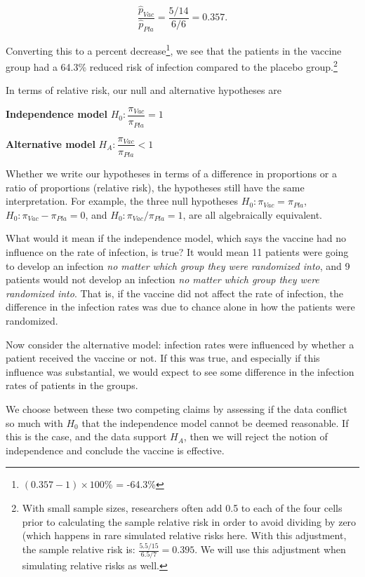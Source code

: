 \documentclass[
  10pt,
  openany]{book}
\theoremstyle{definition}
\theoremstyle{definition}
\theoremstyle{definition}
\theoremstyle{definition}
\theoremstyle{remark}
\begin{document}
\[
\frac{\hat{p}_{Vac}}{\hat{p}_{Pla}} = \frac{5/14}{6/6} = 0.357.
\]

Converting this to a percent decrease\footnote{\((0.357 - 1)\times 100\)\% = -64.3\%}, we see that the patients in the vaccine group had a 64.3\% reduced risk of infection compared to the placebo group.\footnote{With small sample sizes, researchers often add 0.5 to each of the four cells prior to calculating the sample relative risk in order to avoid dividing by zero (which happens in rare simulated relative risks here. With this adjustment, the sample relative risk is: \(\frac{5.5/15}{6.5/7} = 0.395\). We will use this adjustment when simulating relative risks as well.}

In terms of relative risk, our null and alternative hypotheses are

\textbf{Independence model} \(H_0: \dfrac{\pi_{Vac}}{\pi_{Pla}} = 1\)

\textbf{Alternative model} \(H_A: \dfrac{\pi_{Vac}}{\pi_{Pla}} < 1\)

Whether we write our hypotheses in terms of a difference in proportions or a ratio of proportions (relative risk), the hypotheses still have the same interpretation. For example, the three null hypotheses \(H_0: \pi_{Vac} = \pi_{Pla}\), \(H_0: \pi_{Vac} - \pi_{Pla} = 0\), and \(H_0: \pi_{Vac}/\pi_{Pla} = 1\), are all algebraically equivalent.

What would it mean if the independence model, which says the vaccine had no influence on the rate of infection, is true? It would mean 11 patients were going to develop an infection \emph{no matter which group they were randomized into}, and 9 patients would not develop an infection \emph{no matter which group they were randomized into}. That is, if the vaccine did not affect the rate of infection, the difference in the infection rates was due to chance alone in how the patients were randomized.

Now consider the alternative model: infection rates were influenced by whether a patient received the vaccine or not. If this was true, and especially if this influence was substantial, we would expect to see some difference in the infection rates of patients in the groups.

We choose between these two competing claims by assessing if the data conflict so much with \(H_0\) that the independence model cannot be deemed reasonable. If this is the case, and the data support \(H_A\), then we will reject the notion of independence and conclude the vaccine is effective.
\end{document}
